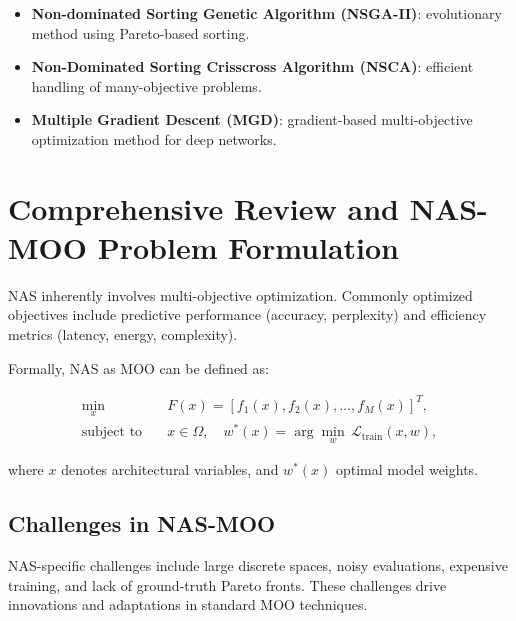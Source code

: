 \documentclass[11pt,a4paper]{article}
\begin{document}
	\begin{itemize}
		\item \textbf{Non-dominated Sorting Genetic Algorithm (NSGA-II)}: evolutionary method using Pareto-based sorting.
		\item \textbf{Non-Dominated Sorting Crisscross Algorithm (NSCA)}: efficient handling of many-objective problems.
		\item \textbf{Multiple Gradient Descent (MGD)}: gradient-based multi-objective optimization method for deep networks.
	\end{itemize}
	
	
	\section{Comprehensive Review and NAS-MOO Problem Formulation}
	\label{sec:NAS_MOO_formulation}
	
	NAS inherently involves multi-objective optimization. Commonly optimized objectives include predictive performance (accuracy, perplexity) and efficiency metrics (latency, energy, complexity).
	
	Formally, NAS as MOO can be defined as:
	
	\begin{equation}
		\label{eq:nas_moo}
		\begin{aligned}
			\min_{x} \quad & F(x) = [f_1(x), f_2(x), \dots, f_M(x)]^T, \\
			\text{subject to} \quad 
			& x \in \Omega, \quad w^*(x) = \arg \min_{w}\, \mathcal{L}_{\text{train}}(x,w),
		\end{aligned}
	\end{equation}
	
	where $x$ denotes architectural variables, and $w^*(x)$ optimal model weights.
	
	\subsection{Challenges in NAS-MOO}
	
	NAS-specific challenges include large discrete spaces, noisy evaluations, expensive training, and lack of ground-truth Pareto fronts. These challenges drive innovations and adaptations in standard MOO techniques.
	
	
\end{document}

